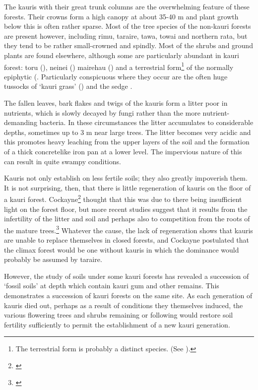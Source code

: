 The kauris with their great trunk columns are the overwhelming feature of these forests.
Their crowns form a high canopy at about 35-40 m and plant growth below this is often rather sparse.
Most of the tree species of the non-kauri forests are present however, including rimu, taraire, tawa, towai and northern rata, but they tend to be rather small-crowned and spindly.
Most of the shrubs and ground plants are found elsewhere, although some are particularly abundant in kauri forest: toru (), neinei () mairehau () and a terrestrial form\footnote{The terrestrial form is probably a distinct species. (See \cite{eagle1982trees}).} of the normally epiphytic  (.
Particularly conspicuous where they occur are the often huge tussocks of `kauri grass' () and the sedge .

The fallen leaves, bark flakes and twigs of the kauris form a litter poor in nutrients, which is slowly decayed by fungi rather than the more nutrient-demanding bacteria.
In these circumstances the litter accumulates to considerable depths, sometimes up to 3 m near large trees.
The litter becomes very acidic and this promotes heavy leaching from the upper layers of the soil and the formation of a thick concretelike iron pan at a lower level.
The impervious nature of this can result in quite swampy conditions.

Kauris not only establish on less fertile soils; they also greatly impoverish them.
It is not surprising, then, that there is little regeneration of kauris on the floor of a kauri forest.
Cockayne\footnote{\cite{cockayne1928vegetation}} thought that this was due to there being insufficient light on the forest floor, but more recent studies suggest that it results from the infertility of the litter and soil and perhaps also to competition from the roots of the mature trees.\footnote{\cite{bieleski1959factors}}
Whatever the cause, the lack of regeneration shows that kauris are unable to replace themselves in closed forests, and Cockayne postulated that the climax forest would be one without kauris in which the dominance would probably be assumed by taraire.

However, the study of soils under some kauri forests has revealed a succession of `fossil soils' at depth which contain kauri gum and other remains.
This demonstrates a succession of kauri forests on the same site.
As each generation of kauris died out, perhaps as a result of conditions they themselves induced, the various flowering trees and shrubs remaining or following would restore soil fertility sufficiently to permit the establishment of a new kauri generation.

